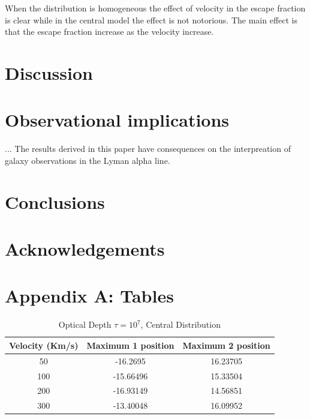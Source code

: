 \documentclass[usenatbib]{mn2e}
\begin{document}
When the distribution is homogeneous the effect of velocity in the
escape fraction is clear while in the central model the effect is not
notorious. 
The main effect is that the escape fraction increase as the velocity
increase.  


\section{Discussion}
\label{sec:discussion}

\section{Observational implications}

... The results derived in this paper have consequences on the
interpreation of galaxy observations in the Lyman alpha line.

\section{Conclusions}

\section*{Acknowledgements}

\section*{Appendix A: Tables}

\begin{table}
\begin{center}
\begin{tabular}{ccc}\hline          
Velocity (Km/s) & Maximum 1 position & Maximum 2 position \\ \hline
50 & -16.2695 & 16.23705 \\ 
100 & -15.66496 & 15.33504 \\ 
200 & -16.93149 & 14.56851 \\ 
300 & -13.40048 & 16.09952 \\ \hline 
\end{tabular} 
\caption{Optical Depth $\tau= 10^{7}$, Central Distribution}
\end{center}
\end{table}
\end{document}
